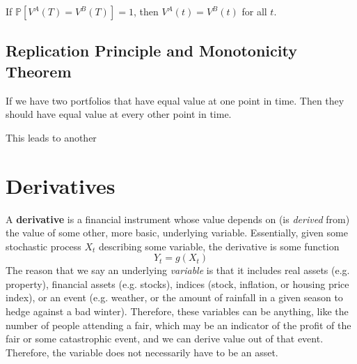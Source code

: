 \documentclass{article}
\begin{document}
    \begin{corollary}[Equality]
      If $\mathbb{P}[V^A (T) = V^B (T)] = 1$, then $V^A (t) = V^B (t)$ for all $t$. 
    \end{corollary}

  \subsection{Replication Principle and Monotonicity Theorem}

    \begin{theorem}
      If we have two portfolios that have equal value at one point in time. Then they should have equal value at every other point in time. 
    \end{theorem}

    This leads to another 

\section{Derivatives}

  \begin{definition}[Derivatives]
    A \textbf{derivative} is a financial instrument whose value depends on (is \textit{derived} from) the value of some other, more basic, underlying variable. Essentially, given some stochastic process $X_t$ describing some variable, the derivative is some function 
    \begin{equation}
      Y_t = g(X_t)
    \end{equation}
    The reason that we say an underlying \textit{variable} is that it includes real assets (e.g. property), financial assets (e.g. stocks), indices (stock, inflation, or housing price index), or an event (e.g. weather, or the amount of rainfall in a given season to hedge against a bad winter). Therefore, these variables can be anything, like the number of people attending a fair, which may be an indicator of the profit of the fair or some catastrophic event, and we can derive value out of that event. Therefore, the variable does not necessarily have to be an asset. 
  \end{definition}
\end{document}
